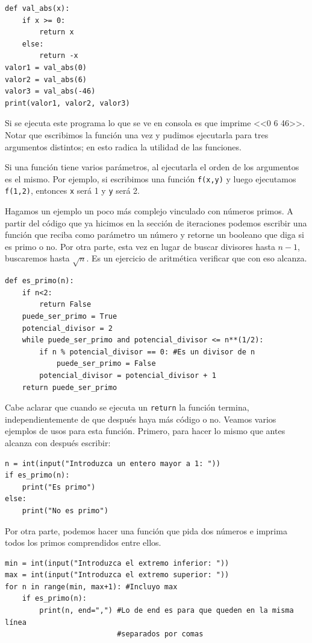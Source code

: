 \documentclass[a4paper, 12pt]{report}
\theoremstyle{definition}
\begin{document}
\begin{verbatim}
def val_abs(x):
    if x >= 0:
        return x
    else:
        return -x
valor1 = val_abs(0)
valor2 = val_abs(6)
valor3 = val_abs(-46)
print(valor1, valor2, valor3)
\end{verbatim}
Si se ejecuta este programa lo que se ve en consola es que imprime <<0 6 46>>. Notar que escribimos la función una vez y pudimos ejecutarla para tres argumentos distintos; en esto radica la utilidad de las funciones.

Si una función tiene varios parámetros, al ejecutarla el orden de los argumentos es el mismo. Por ejemplo, si escribimos una función {\tt f(x,y)} y luego ejecutamos {\tt f(1,2)}, entonces {\tt x} será 1 y {\tt y} será 2.

Hagamos un ejemplo un poco más complejo vinculado con números primos. A partir del código que ya hicimos en la sección de iteraciones podemos escribir una función que reciba como parámetro un número y retorne un booleano que diga si es primo o no. Por otra parte, esta vez en lugar de buscar divisores hasta $n-1$, buscaremos hasta $\sqrt{n}$. Es un ejercicio de aritmética verificar que con eso alcanza.
\begin{verbatim}
def es_primo(n):
    if n<2:
        return False
    puede_ser_primo = True
    potencial_divisor = 2
    while puede_ser_primo and potencial_divisor <= n**(1/2):
        if n % potencial_divisor == 0: #Es un divisor de n
            puede_ser_primo = False
        potencial_divisor = potencial_divisor + 1
    return puede_ser_primo
\end{verbatim}
Cabe aclarar que cuando se ejecuta un {\tt return} la función termina, independientemente de que después haya más código o no. Veamos varios ejemplos de usos para esta función. Primero, para hacer lo mismo que antes alcanza con después escribir:
\begin{verbatim}
n = int(input("Introduzca un entero mayor a 1: "))
if es_primo(n):
    print("Es primo")
else:
    print("No es primo")
\end{verbatim}
Por otra parte, podemos hacer una función que pida dos números e imprima todos los primos comprendidos entre ellos.
\begin{verbatim}
min = int(input("Introduzca el extremo inferior: "))
max = int(input("Introduzca el extremo superior: "))
for n in range(min, max+1): #Incluyo max
    if es_primo(n):
        print(n, end=",") #Lo de end es para que queden en la misma línea
                          #separados por comas
\end{verbatim}
\end{document}
